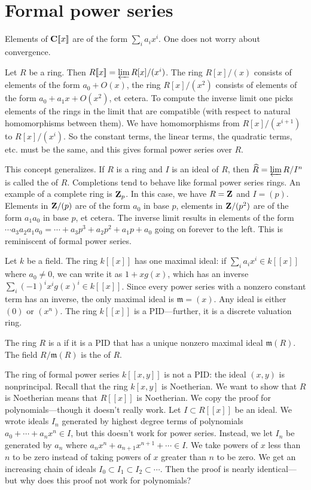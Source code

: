 \documentclass[11pt, oneside,margin=1in]{article}
\begin{document}
\section{Formal power series}
Elements of $\mathbf C[\![x]\!]$ are of the form $\sum_i a_ix^i$. One does not worry about convergence.

Let $R$ be a ring. Then $R[\![x]\!]=\varprojlim R[x]/(x^i)$. The ring $R[x]/(x)$ consists of elements of the form $a_0 + O(x)$, the ring $R[x]/(x^2)$ consists of elements of the form $a_0 + a_1x + O(x^2)$, et cetera. To compute the inverse limit one picks elements of the rings in the limit that are compatible (with respect to natural homomorphisms between them). We have homomorphisms from $R[x]/(x^{i+1})$ to $R[x]/(x^i) $. So the constant terms, the linear terms, the quadratic terms, etc. must be the same, and this gives formal power series over $R$. 

This concept generalizes. If $R$ is a ring and $I$ is an ideal of $R$, then $\widehat{R}=\varprojlim R/I^n$ is called the  of $R$. Completions tend to behave like formal power series rings. An example of a complete ring is $\mathbf Z_p$. In this case, we have $R=\mathbf Z$ and $I = (p)$. Elements in $\mathbf Z/(p)$ are of the form $a_0$ in base $p$, elements in $\mathbf Z/(p^2)$ are of the form $a_1a_0$ in base $p$, et cetera. The inverse limit results in elements of the form $\cdots a_3a_2a_1a_0 = \cdots + a_3p^3 + a_2p^2 + a_1p + a_0$ going on forever to the left. This is reminiscent of formal power series.

Let $k$ be a field. The ring $k[\![x]\!]$ has one maximal ideal: if $\sum_i a_ix^i\in k[\![x]\!]$ where $a_0\ne 0$, we can write it as $1 + xg (x)$, which has an inverse $\sum_i (-1)^i x^i g (x)^i\in k [\![x]\!]$. Since every power series with a nonzero constant term has an inverse, the only maximal ideal is $\mathfrak{m} = (x)$. Any ideal is either $(0)$ or $(x^n)$. The ring $k[\![x]\!]$ is a PID---further, it is a {discrete valuation ring}.

\begin{definition}[ ]\label{}
The ring $R$ is a  if it is a PID that has a unique nonzero maximal ideal $\mathfrak{m}(R)$. The field $R/\mathfrak{m}(R)$ is the  of $R$. 
\end{definition}

The ring of formal power series $k[\![x,y]\!]$ is not a PID: the ideal $(x,y)$ is nonprincipal. Recall that the ring $k[x,y]$ is Noetherian. We want to show that $R$ is Noetherian means that $R[\![x]\!]$ is Noetherian. We copy the proof for polynomials---though it doesn't really work. Let $I\subset R[\![x]\!]$ be an ideal. We wrote ideals $I_n$ generated by highest degree terms of polynomials $a_0 + \cdots + a_nx^n\in I$, but this doesn't work for power series. Instead, we let $I_n$ be generated by $a_n$ where $a_nx^n + a_{n+1}x^{n+1} + \cdots \in I$. We take powers of $x$ less than $n$ to be zero instead of taking powers of $x$ greater than $n$ to be zero. We get an increasing chain of ideals $I_0 \subset I_1 \subset I_2 \subset \cdots$. Then the proof is nearly identical---but why does this proof not work for polynomials?
\end{document}
